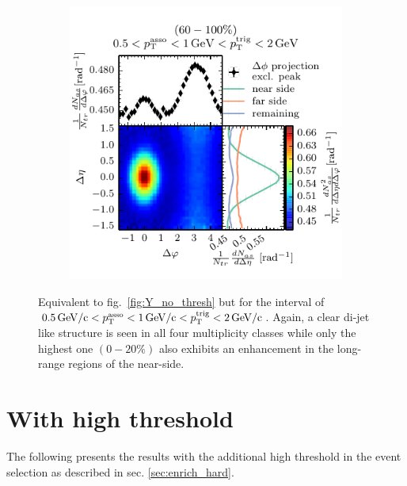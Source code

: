 \begin{figure}
\begin{subfigure}[b]{0.5\textwidth}
    \includegraphics[]{figures/051_12_class3.pdf}
  \end{subfigure}
  \caption[Total associated yield per trigger particle for all four multiplicity classes and the \ptassoc (\pttrig) interval of $1-\SI{2}{GeV/c}$ ($2-\SI{4}{GeV/c}$) and with threshold required.]{Equivalent to fig.~\ref{fig:Y_no_thresh} but for the interval of $\SI{0.5}{GeV/c} < p_{\text{T}}^{\text{asso}} < \SI{1}{GeV/c} < p_{\text{T}}^{\text{trig}} < \SI{2}{GeV/c}$. Again, a clear di-jet like structure is seen in all four multiplicity classes while only the highest one $(0-20\%)$ also exhibits an enhancement in the long-range regions of the near-side.}
  \label{fig:no_thresh_summary_0512}
\end{figure}



\section{With high \pt threshold}
\label{sec:with-thres}

The following presents the results with the additional high \pt threshold in the event selection as described in sec. \ref{sec:enrich_hard}.


